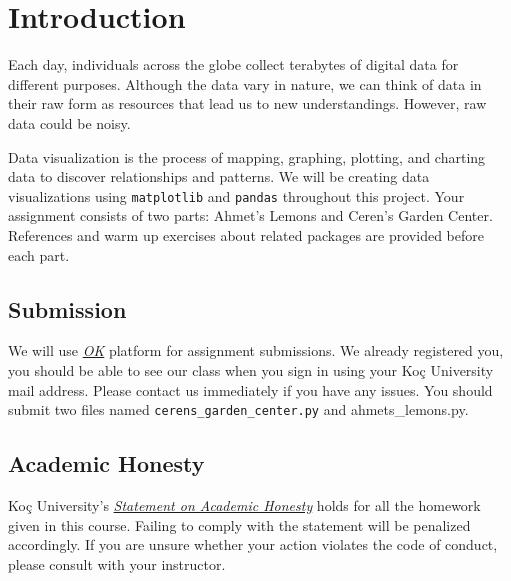 \documentclass[a4paper]{article}
\author{Hasan Can Aslan}
\title{\projectTitle}
\date{Submission Date: \projectDate}
\newcommand{\projectTitle}{Data Visualization}
\newcommand{\assignmentNumber}{2}
\begin{document}
\maketitle

\lstset{language=Python}
\pagestyle{fancy}
\fancyhf{}
\chead{\projectTitle}
\rhead{Assignment \#\assignmentNumber}
\lfoot{\nouppercase{\leftmark}}
\thispagestyle{fancy}
\renewcommand{\headrulewidth}{0.4pt}
\renewcommand{\footrulewidth}{0.4pt}


\section{Introduction}

Each day, individuals across the globe collect terabytes of digital data for different purposes. Although the data vary in nature, we can think of data in their raw form as resources that lead us to new understandings. However, raw data could be noisy.

Data visualization is the process of mapping, graphing, plotting, and charting data to discover relationships and patterns. We will be creating data visualizations using \texttt{matplotlib} and \texttt{pandas} throughout this project. Your assignment consists of two parts: Ahmet's Lemons and Ceren's Garden Center. References and warm up exercises about related packages are provided before each part.


\subsection{Submission}
We will use \emph{\href{https://okpy.org}{OK}} platform for assignment submissions. We already registered you, you should be able to see our class when you sign in using your Koç University mail address. Please contact us immediately if you have any issues. You should submit two files named \texttt\texttt{cerens\_garden\_center.py} and {ahmets\_lemons.py}.

\subsection{Academic Honesty}
Koç University's \emph{\href{https://vpaa.ku.edu.tr/sites/vpaa.ku.edu.tr/files/Misc_Documents/Statement_on_Academic_Honesty.pdf}{Statement on Academic Honesty}} holds for all the homework given in this course. Failing to comply with the statement will be penalized accordingly. If you are unsure whether your action violates the code of conduct, please consult with your instructor.
\end{document}
